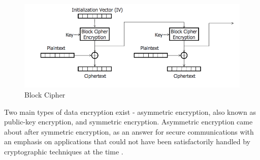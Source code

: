 \documentclass[journal]{IEEEtran}
\begin{document}
\newline
\begin{figure}[!hb]
    \centering
    \includegraphics[scale=.3]{block_cipher}
    \caption{Block Cipher}
    \label{fig:block_cipher}
\end{figure}

Two main types of data encryption exist - asymmetric encryption, also known as public-key encryption, and symmetric encryption. Asymmetric encryption came about after symmetric encryption, as an answer for secure communications with an emphasis on applications that could not have been satisfactorily handled by cryptographic techniques at the time \cite{asymm_symm}. %
\end{document}
